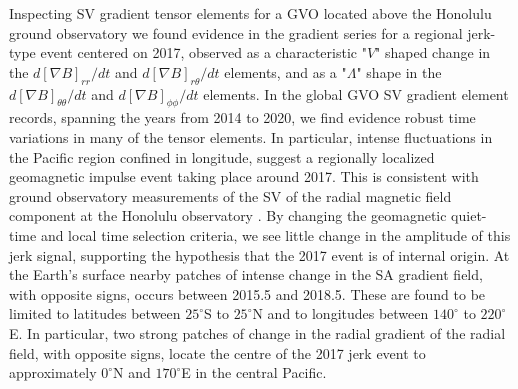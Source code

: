 \documentclass[extra,mreferee]{gji}
\begin{document}
Inspecting SV gradient tensor elements for a GVO located above the Honolulu ground observatory we found evidence in the gradient series for a regional jerk-type event centered on 2017, observed as a characteristic "$V$" shaped change in the $d\left[\nabla B\right]_{rr}/dt$ and $d\left[\nabla B\right]_{r \theta}/dt$ elements, and as a "$\Lambda$" shape in the $d\left[\nabla B\right]_{\theta \theta}/dt$ and $d\left[\nabla B\right]_{\phi \phi}/dt$ elements. In the global GVO SV gradient element records, spanning the years from 2014 to 2020, we find evidence  robust time variations in many of the tensor elements. In particular, intense fluctuations in the Pacific region confined in longitude, suggest a regionally localized geomagnetic impulse event taking place around 2017. This is consistent with ground observatory measurements of the SV of the radial magnetic field component at the Honolulu observatory  \cite[e.g.][]{Finlay_etal_2020,Sabaka_etal_2018}. By changing the geomagnetic quiet-time and local time selection criteria, we see little change in the amplitude of this jerk signal, supporting the hypothesis that the 2017 event is of internal origin. At the Earth's surface nearby patches of intense change in the SA gradient field, with opposite signs, occurs between 2015.5 and 2018.5. These are found to be limited to latitudes between $25^{\circ}$S to $25^{\circ}$N and to longitudes between $140^{\circ}$ to $220^{\circ}$E. In particular, two strong patches of change in the radial gradient of the radial field, with opposite signs, locate the centre of the 2017 jerk event to approximately $0^{\circ}$N and $170^{\circ}$E in the central Pacific. 
\end{document}

